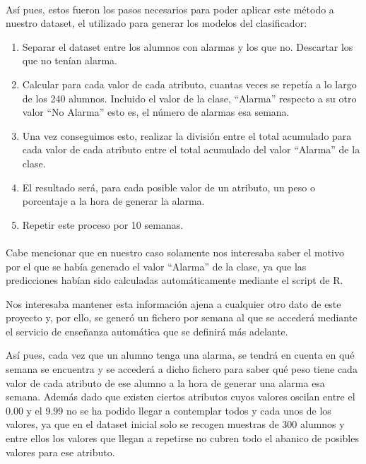 \paragraph{}
Así pues, estos fueron los pasos necesarios para poder aplicar este método a nuestro dataset, el utilizado para generar los modelos del clasificador:
\begin{enumerate}
\item Separar el dataset entre los alumnos con alarmas y los que no. Descartar los que no tenían alarma.
\item Calcular para cada valor de cada atributo, cuantas veces se repetía a lo largo de los 240 alumnos. Incluido el valor de la clase, “Alarma” respecto a su otro valor “No Alarma” esto es, el número de alarmas esa semana.
\item Una vez conseguimos esto, realizar la división entre el total acumulado para cada valor de cada atributo entre el total acumulado del valor “Alarma” de la clase.
\item El resultado será, para cada posible valor de un atributo, un peso o porcentaje a la hora de generar la alarma.
\item Repetir este proceso por 10 semanas.
\end{enumerate}

\paragraph{}
Cabe mencionar que en nuestro caso solamente nos interesaba saber el motivo por el que se había generado el valor “Alarma” de la clase, ya que las predicciones habían sido calculadas automáticamente mediante el script de R.

Nos interesaba mantener esta información ajena a cualquier otro dato de este proyecto y, por ello, se generó un fichero por semana al que se accederá mediante el servicio de enseñanza automática que se definirá más adelante.

Así pues, cada vez que un alumno tenga una alarma, se tendrá en cuenta en qué semana se encuentra y se accederá a dicho fichero para saber qué peso tiene cada valor de cada atributo de ese alumno a la hora de generar una alarma esa semana. Además dado que existen ciertos atributos cuyos valores oscilan entre el 0.00 y el 9.99 no se ha podido llegar a contemplar todos y cada unos de los valores, ya que en el dataset inicial solo se recogen muestras de 300 alumnos y entre ellos los valores que llegan a repetirse no cubren todo el abanico de posibles valores para ese atributo.

